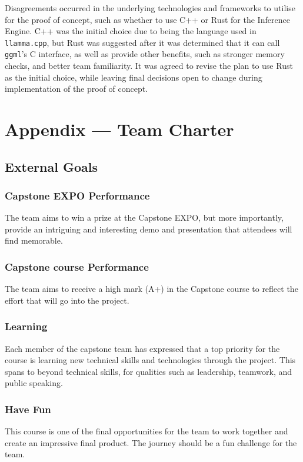 \documentclass{article}
\begin{document}
\begin{enumerate}
    Disagreements occurred in the underlying technologies and frameworks to utilise for the proof of concept, such as whether to use C++ or Rust for the Inference Engine. C++ was the initial choice due to being the language used in \verb|llamma.cpp|, but Rust was suggested after it was determined that it can call \verb|ggml|'s C interface, as well as provide other benefits, such as stronger memory checks, and better team familiarity. It was agreed to revise the plan to use Rust as the initial choice, while leaving final decisions open to change during implementation of the proof of concept.

\end{enumerate}

\newpage{}

\section*{Appendix --- Team Charter}

\subsection*{External Goals}

\subsubsection{Capstone EXPO Performance}
The team aims to win a prize at the Capstone EXPO, but more importantly, provide an intriguing and interesting demo and presentation that attendees will find memorable.

\subsubsection{Capstone course Performance}
The team aims to receive a high mark (A+) in the Capstone course to reflect the effort that will go into the project.

\subsubsection{Learning}
Each member of the capstone team has expressed that a top priority for the course is learning new technical skills and technologies through the project. This spans to beyond technical skills, for qualities
such as leadership, teamwork, and public speaking.

\subsubsection{Have Fun}
This course is one of the final opportunities for the team to work together and create an impressive final product. The journey should be a fun challenge for the team.
\end{document}
